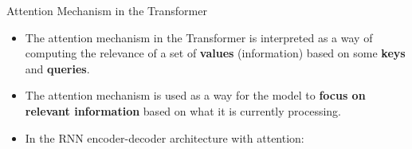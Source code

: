 \documentclass[handout]{beamer}
\begin{document}
\begin{frame}{Attention Mechanism in the Transformer}
\begin{scriptsize}
\begin{itemize}
 \item The attention mechanism in the Transformer is interpreted as a way of computing the relevance of a set of \textbf{values} (information) based on some \textbf{keys} and \textbf{queries}. 
 
 \item The attention mechanism is used as a way for the model to \textbf{focus on relevant information} based on what it is currently processing.
 
 \item In the RNN encoder-decoder architecture with attention:
 

 \begin{enumerate}

 \end{enumerate}

 
\end{itemize}



\end{scriptsize}

\end{frame}
\end{document}
